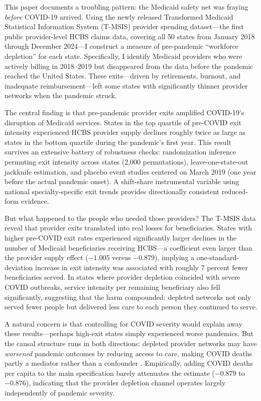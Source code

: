\documentclass[12pt]{article}
\begin{document}
This paper documents a troubling pattern: the Medicaid safety net was fraying \emph{before} COVID-19 arrived. Using the newly released Transformed Medicaid Statistical Information System (T-MSIS) provider spending dataset---the first public provider-level HCBS claims data, covering all 50 states from January 2018 through December 2024---I construct a measure of pre-pandemic ``workforce depletion'' for each state. Specifically, I identify Medicaid providers who were actively billing in 2018--2019 but disappeared from the data before the pandemic reached the United States. These exits---driven by retirements, burnout, and inadequate reimbursement---left some states with significantly thinner provider networks when the pandemic struck.

The central finding is that pre-pandemic provider exits amplified COVID-19's disruption of Medicaid services. States in the top quartile of pre-COVID exit intensity experienced HCBS provider supply declines roughly twice as large as states in the bottom quartile during the pandemic's first year. This result survives an extensive battery of robustness checks: randomization inference permuting exit intensity across states (2,000 permutations), leave-one-state-out jackknife estimation, and placebo event studies centered on March 2019 (one year before the actual pandemic onset). A shift-share instrumental variable using national specialty-specific exit trends provides directionally consistent reduced-form evidence.

But what happened to the people who needed those providers? The T-MSIS data reveal that provider exits translated into real losses for beneficiaries. States with higher pre-COVID exit rates experienced significantly larger declines in the number of Medicaid beneficiaries receiving HCBS---a coefficient even larger than the provider supply effect ($-1.005$ versus $-0.879$), implying a one-standard-deviation increase in exit intensity was associated with roughly 7 percent fewer beneficiaries served. In states where provider depletion coincided with severe COVID outbreaks, service intensity per remaining beneficiary also fell significantly, suggesting that the harm compounded: depleted networks not only served fewer people but delivered less care to each person they continued to serve.

A natural concern is that controlling for COVID severity would explain away these results---perhaps high-exit states simply experienced worse pandemics. But the causal structure runs in both directions: depleted provider networks may have \emph{worsened} pandemic outcomes by reducing access to care, making COVID deaths partly a mediator rather than a confounder \citep{angrist2009,pearl2009}. Empirically, adding COVID deaths per capita to the main specification barely attenuates the estimate ($-0.879$ to $-0.876$), indicating that the provider depletion channel operates largely independently of pandemic severity.
\end{document}
